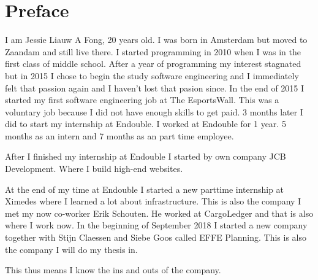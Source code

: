 \chapter*{Preface}
I am Jessie Liauw A Fong, 20 years old. I was born in Amsterdam but moved to Zaandam and still live there. I started programming in 2010 when I was in the first class of middle school. After a year of programming my interest stagnated but in 2015 I chose to begin the study software engineering and I immediately felt that passion again and I haven’t lost that pasion since. In the end of 2015 I started my first software engineering job at The EsportsWall. This was a voluntary job because I did not have enough skills to get paid. 3 months later I did to start my internship at Endouble. I worked at Endouble for 1 year. 5 months as an intern and 7 months as an part time employee.

After I finished my internship at Endouble I started by own company JCB Development. Where I build high-end websites.

At the end of my time at Endouble I started a new parttime internship at Ximedes where I learned a lot about infrastructure. This is also the company I met my now co-worker Erik Schouten. He worked at CargoLedger and that is also where I work now. In the beginning of September 2018 I started a new company together with Stijn Claessen and Siebe Goos called EFFE Planning. This is also the company I will do my thesis in.

This thus means I know the ins and outs of the company.
